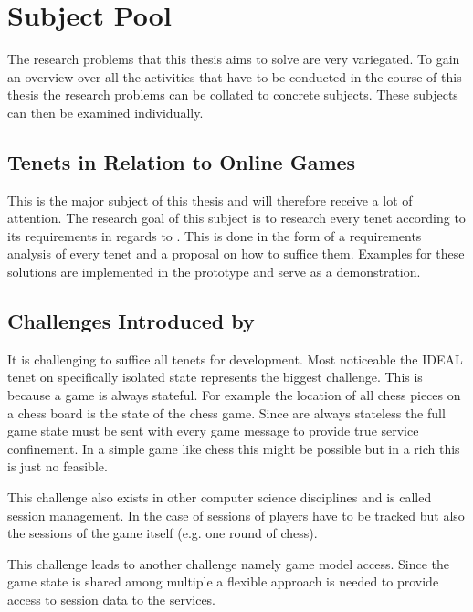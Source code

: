 \section{Subject Pool}
\label{sec:subject_pool}

The research problems that this thesis aims to solve are very variegated. To
gain an overview over all the activities that have to be conducted in the course
of this thesis the research problems can be collated to concrete subjects. These
subjects can then be examined individually.

\subsection{\ms{} Tenets in Relation to Online Games}

This is the major subject of this thesis and will therefore receive a lot of
attention. The research goal of this subject is to research every \ms{} tenet
according to its requirements in regards to \ogs{}. This is done in the form of
a requirements analysis of every tenet and a proposal on how to suffice them.
Examples for these solutions are implemented in the prototype and serve as a
demonstration. 

\subsection{Challenges Introduced by \mss{}}
\label{sub:ms_challenges}

It is challenging to suffice all \ms{} tenets for \og{} development. Most
noticeable the IDEAL tenet on specifically isolated state represents the biggest
challenge. This is because a game is always stateful. For example the location
of all chess pieces on a chess board is the state of the chess game. Since
\mss{} are always stateless the full game state must be sent with every game
message to provide true service confinement. In a simple game like chess this
might be possible but in a rich \og{} this is just no feasible. 

This challenge also exists in other computer science disciplines and is called
session management. In the case of \ogs{} sessions of players have to be
tracked but also the sessions of the game itself (e.g. one round of chess).

This challenge leads to another challenge namely game model access. Since the
game state is shared among multiple \mss{} a flexible approach is needed to
provide access to session data to the services.

